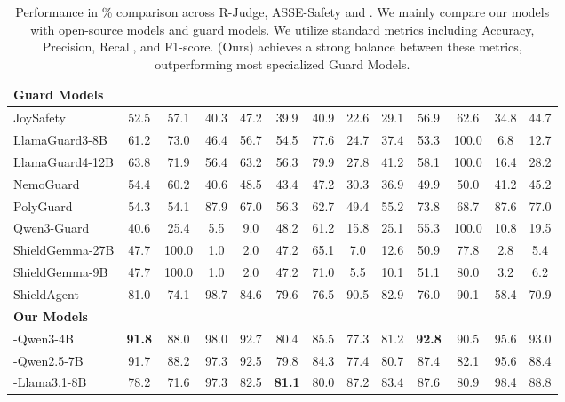 \begin{table}[t]
{\begin{tabular}{lcccccccccccc}
    \midrule
    \multicolumn{13}{l}{\textbf{Guard Models}} \\
    \midrule
    JoySafety & 52.5 & 57.1 & 40.3 & 47.2 & 39.9 & 40.9 & 22.6 & 29.1 & 56.9 & 62.6 & 34.8 & 44.7 \\
    LlamaGuard3-8B\footnotemark[1] & 61.2 & 73.0 & 46.4 & 56.7 & 54.5 & 77.6 & 24.7 & 37.4 & 53.3 & 100.0 & 6.8 & 12.7 \\
    LlamaGuard4-12B\footnotemark[1]  & 63.8 & 71.9 & 56.4 & 63.2 & 56.3 & 79.9 & 27.8 & 41.2 & 58.1 & 100.0 & 16.4 & 28.2 \\
    NemoGuard & 54.4 & 60.2 & 40.6 & 48.5 & 43.4 & 47.2 & 30.3 & 36.9 & 49.9 & 50.0 & 41.2 & 45.2 \\
    PolyGuard & 54.3 & 54.1 & 87.9 & 67.0 & 56.3 & 62.7 & 49.4 & 55.2 & 73.8 & 68.7 & 87.6 & 77.0 \\
    Qwen3-Guard\footnotemark[1]  & 40.6 & 25.4 & 5.5 & 9.0 & 48.2 & 61.2 & 15.8 & 25.1 & 55.3 & 100.0 & 10.8 & 19.5 \\
    ShieldGemma-27B\footnotemark[2]  & 47.7 & 100.0 & 1.0 & 2.0 & 47.2 & 65.1 & 7.0 & 12.6 & 50.9 & 77.8 & 2.8 & 5.4 \\
    ShieldGemma-9B\footnotemark[2] & 47.7 & 100.0 & 1.0 & 2.0 & 47.2 & 71.0 & 5.5 & 10.1 & 51.1 & 80.0 & 3.2 & 6.2 \\
    ShieldAgent & 81.0 & 74.1 & 98.7 & 84.6 & 79.6 & 76.5 & 90.5 & 82.9 & 76.0 & 90.1 & 58.4 & 70.9 \\
    \midrule
    \multicolumn{13}{l}{\textbf{Our Models}} \\
    \midrule
    \toolAG{}-Qwen3-4B & \textbf{91.8} & 88.0 & 98.0 & 92.7 & 80.4 & 85.5 & 77.3 & 81.2 & \textbf{92.8} & 90.5 & 95.6 & 93.0 \\
    \toolAG{}-Qwen2.5-7B & 91.7 & 88.2 & 97.3 & 92.5 & 79.8 & 84.3 & 77.4 & 80.7 & 87.4 & 82.1 & 95.6 & 88.4 \\
    \toolAG{}-Llama3.1-8B & 78.2 & 71.6 & 97.3 & 82.5 & \textbf{81.1} & 80.0 & 87.2 & 83.4 & 87.6 & 80.9 & 98.4 & 88.8 \\
    
    \bottomrule
    
    \end{tabular}
    }
    \caption{Performance in \% comparison across R-Judge, ASSE-Safety and \toolBench{}. We mainly compare our models with open-source models and guard models. We utilize standard metrics including Accuracy, Precision, Recall, and F1-score. \toolAG{} (Ours) achieves a strong balance between these metrics, outperforming most specialized Guard Models.}
    \label{tab:main_results}
\end{table}

